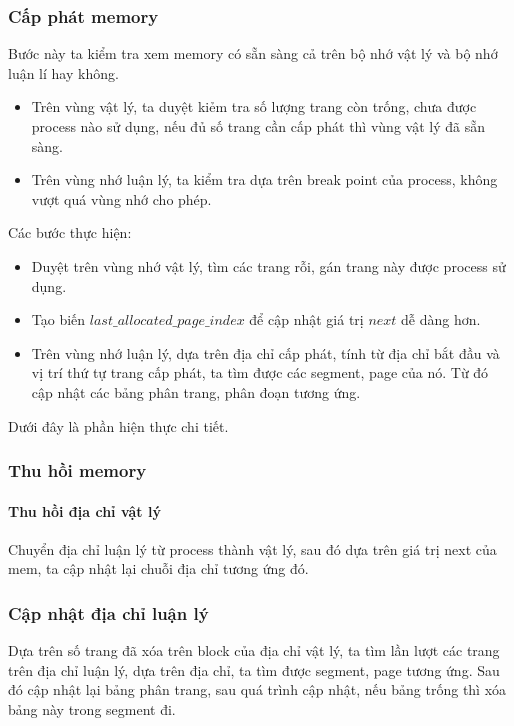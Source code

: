 


\newpage 
\subsubsection{Cấp phát memory}


Bước này ta kiểm tra xem memory có sẵn sàng cả trên bộ nhớ vật lý và bộ nhớ luận lí hay không.

\begin{itemize}
	\item Trên vùng vật lý, ta duyệt kiẻm tra số lượng trang còn trống, chưa được process nào sử dụng, nếu đủ số trang cần cấp phát thì vùng vật lý đã sẵn sàng.
	\item Trên vùng nhớ luận lý, ta kiểm tra dựa trên break point của process, không vượt quá vùng nhớ cho phép.
\end{itemize}





\newpage
{}

Các bước thực hiện:

\begin{itemize}
	\item Duyệt trên vùng nhớ vật lý, tìm các trang rỗi, gán trang này được process sử dụng.
	\item Tạo biến $ last\_allocated\_page\_index $ để cập nhật giá trị $ next $ dễ dàng hơn.
	\item Trên vùng nhớ luận lý, dựa trên địa chỉ cấp phát, tính từ địa chỉ bắt đầu và vị trí thứ tự trang cấp phát, ta tìm được các segment, page của nó. Từ đó cập nhật các bảng phân trang, phân đoạn tương ứng.
\end{itemize}


Dưới đây là phần hiện thực chi tiết.



\newpage
\subsubsection{Thu hồi memory}

\paragraph{Thu hồi địa chỉ vật lý}
Chuyển địa chỉ luận lý từ process thành  vật lý, sau đó dựa trên giá trị next của mem, ta cập nhật lại chuỗi địa chỉ tương ứng đó. 


\subsubsection{Cập nhật địa chỉ luận lý}
Dựa trên số trang đã xóa trên block của địa chỉ vật lý, ta tìm lần lượt các trang trên địa chỉ luận lý, dựa trên địa chỉ, ta tìm được segment, page tương ứng. Sau đó cập nhật lại bảng phân trang, sau quá trình cập nhật, nếu bảng trống thì xóa bảng này trong segment đi.


